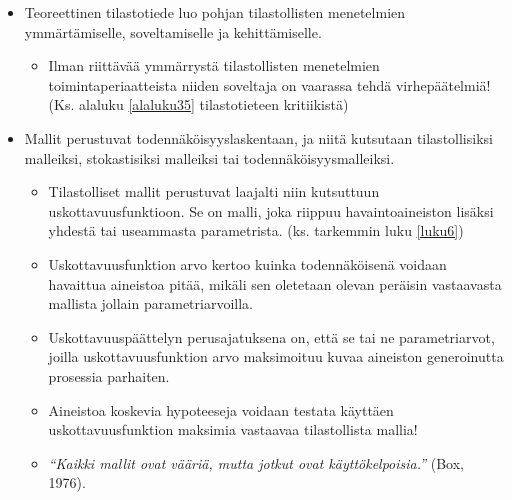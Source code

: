 \documentclass[
]{book}
\providecommand{\tightlist}{%
  \setlength{\itemsep}{0pt}\setlength{\parskip}{0pt}}
\begin{document}
\begin{itemize}
\tightlist
\item
  Teoreettinen tilastotiede luo pohjan tilastollisten menetelmien ymmärtämiselle, soveltamiselle ja kehittämiselle.

  \begin{itemize}
  \tightlist
  \item
    Ilman riittävää ymmärrystä tilastollisten menetelmien toimintaperiaatteista niiden soveltaja on vaarassa tehdä virhepäätelmiä! (Ks. alaluku \ref{alaluku35} tilastotieteen kritiikistä)
  \end{itemize}
\item
  Mallit perustuvat todennäköisyyslaskentaan, ja niitä kutsutaan tilastollisiksi malleiksi, stokastisiksi malleiksi tai todennäköisyysmalleiksi.

  \begin{itemize}
  \tightlist
  \item
    Tilastolliset mallit perustuvat laajalti niin kutsuttuun uskottavuusfunktioon. Se on malli, joka riippuu havaintoaineiston lisäksi yhdestä tai useammasta parametrista. (ks. tarkemmin luku \ref{luku6})
  \item
    Uskottavuusfunktion arvo kertoo kuinka todennäköisenä voidaan havaittua aineistoa pitää, mikäli sen oletetaan olevan peräisin vastaavasta mallista jollain parametriarvoilla.
  \item
    Uskottavuuspäättelyn perusajatuksena on, että se tai ne parametriarvot, joilla uskottavuusfunktion arvo maksimoituu kuvaa aineiston generoinutta prosessia parhaiten.
  \item
    Aineistoa koskevia hypoteeseja voidaan testata käyttäen uskottavuusfunktion maksimia vastaavaa tilastollista mallia!
  \item
    \emph{``Kaikki mallit ovat vääriä, mutta jotkut ovat käyttökelpoisia.''} (Box, 1976).
  \end{itemize}
\end{itemize}

\hfill\break
\hfill\break
\end{document}
